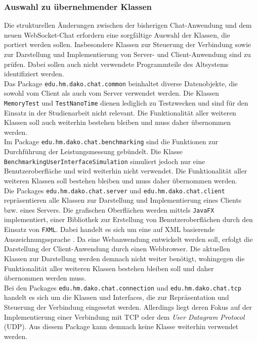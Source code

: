 \documentclass[11pt,a4paper,titlepage]{scrartcl}
\numberwithin{equation}{section}
\begin{document}
\subsubsection{Auswahl zu übernehmender Klassen }
Die strukturellen Änderungen zwischen der bisherigen Chat-Anwendung und dem neuen WebSocket-Chat erfordern eine sorgfältige Auswahl der Klassen, die portiert werden sollen. Insbesondere Klassen zur Steuerung der Verbindung sowie zur Darstellung und Implementierung von Server- und Client-Anwendung sind zu prüfen. Dabei sollen auch nicht verwendete Programmteile des Altsystems identifiziert werden.\\

\noindent Das Package \texttt{edu.hm.dako.chat.common} beinhaltet diverse Datenobjekte, die sowohl vom Client als auch vom Server verwendet werden. Die Klassen \texttt{MemoryTest} und \texttt{TestNanoTime} dienen lediglich zu Testzwecken und sind für den Einsatz in der Studienarbeit nicht relevant. Die Funktionalität aller weiteren Klassen soll auch weiterhin bestehen bleiben und muss daher übernommen werden. \\

\noindent Im Package \texttt{edu.hm.dako.chat.benchmarking} sind die Funktionen zur Durchführung der Leistungsmessung gebündelt. Die Klasse \texttt{BenchmarkingUserInterfaceSimulation} simuliert jedoch nur eine Benutzeroberfläche und wird weiterhin nicht verwendet. Die Funktionalität aller weiteren Klassen soll bestehen bleiben und muss daher übernommen werden. \\

\noindent Die Packages \texttt{edu.hm.dako.chat.server} und \texttt{edu.hm.dako.chat.client} repräsentieren alle Klassen zur Darstellung und Implementierung eines Clients bzw. eines Servers. Die grafischen Oberflächen werden mittels \texttt{JavaFX} implementiert, einer Bibliothek zur Erstellung von Benutzeroberflächen durch den Einsatz von \texttt{FXML}. Dabei handelt es sich um eine auf XML basierende Auszeichnungssprache \autocite{oracle_corporation_javafx_2014}. Da eine Webanwendung entwickelt werden soll, erfolgt die Darstellung der Client-Anwendung durch einen Webbrowser. Die aktuellen Klassen zur Darstellung werden demnach nicht weiter benötigt, wohingegen die Funktionalität aller weiteren Klassen bestehen bleiben soll und daher übernommen werden muss.\\

\noindent Bei den Packages \texttt{edu.hm.dako.chat.connection} und \texttt{edu.hm.dako.chat.tcp} handelt es sich um die Klassen und Interfaces, die zur Repräsentation und Steuerung der Verbindung eingesetzt werden. Allerdings liegt deren Fokus auf der Implementierung einer Verbindung mit TCP oder dem \textit{User Datagram Protocol} (UDP). Aus diesem Package kann demnach keine Klasse weiterhin verwendet werden.\\
\end{document}

